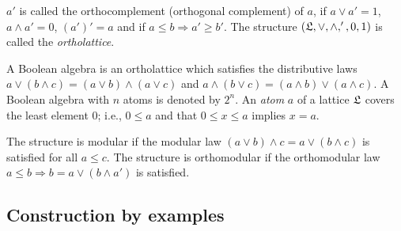 $a'$ is called the orthocomplement (orthogonal complement) of $a$, if
$a\vee
a'=1$, $a\wedge  a' =0$, $(a')'=a$ and if $a\le b\Rightarrow a' \ge b'$.
The structure $({\frak L}, \vee  ,\wedge  , ' ,0,1)$ is called the  {\em
ortholattice}.


A Boolean algebra is an ortholattice which satisfies the
distributive laws
$a \vee  (b\wedge  c)=(a\vee  b)\wedge  (a\vee  c)$ and
$a \wedge  (b\vee  c)=(a\wedge  b)\vee  (a\wedge  c)$.
A Boolean algebra with
$n$ atoms is denoted by
$2^n$. An {\em atom} $a$ of a lattice ${\frak L}$
covers the
least element
${
0}$; i.e.,
 $0\le a$ and that $0\le x\le a$ implies $x=a$.

The structure is modular if the modular law
$(a\vee b)\wedge  c= a\vee     (b \wedge     c)$
is satisfied for all $a\le c$.
The structure is orthomodular if the orthomodular law
$a \le b \Rightarrow b= a\vee  (b\wedge  a')$
is satisfied.


\subsection{Construction by examples}

